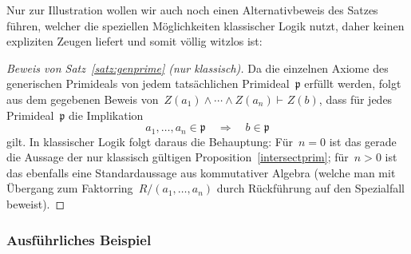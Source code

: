 \documentclass[a4paper,ngerman,12pt]{scrartcl}
\theoremstyle{definition}
\theoremstyle{plain}
\theoremstyle{remark}
\newcommand{\pp}{\mathfrak{p}}
\newcommand{\seq}[1]{\mathrel{\vdash\!\!\!_{#1}}}
\renewcommand{\_}{\mathpunct{.}\,}
\newcommand{\?}{\,{:}\,}
\begin{document}
Nur zur Illustration wollen wir auch noch einen Alternativbeweis des Satzes
führen, welcher die speziellen Möglichkeiten klassischer Logik nutzt, daher
keinen expliziten Zeugen liefert und somit völlig witzlos ist:
\begin{proof}[Beweis von Satz~\ref{satz:genprime} (nur klassisch)]
Da die einzelnen Axiome des generischen Primideals von jedem tatsächlichen
Primideal~$\pp$ erfüllt werden, folgt aus dem gegebenen Beweis von~$Z(a_1) \wedge
\cdots \wedge Z(a_n) \seq{} Z(b)$, dass für jedes Primideal~$\pp$ die
Implikation
\[ a_1,\ldots,a_n \in \pp \quad\Longrightarrow\quad b \in \pp \]
gilt. In klassischer Logik folgt daraus die Behauptung: Für~$n = 0$ ist das
gerade die Aussage der nur klassisch gültigen Proposition~\ref{intersectprim};
für~$n > 0$ ist das ebenfalls eine Standardaussage aus kommutativer Algebra
(welche man mit Übergang zum Faktorring~$R/(a_1,\ldots,a_n)$ durch Rückführung auf den Spezialfall beweist).
\end{proof}


\subsubsection*{Ausführliches Beispiel}
\end{document}
